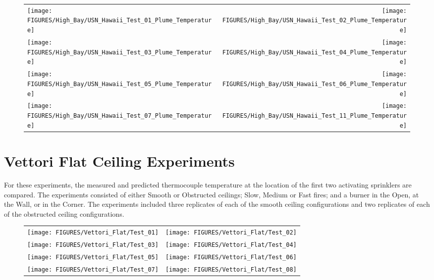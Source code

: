 \begin{figure}[p]
\begin{tabular*}{\textwidth}{l@{\extracolsep{\fill}}r}
\texttt{[image: FIGURES/High\_Bay/USN\_Hawaii\_Test\_01\_Plume\_Temperature]} &
\texttt{[image: FIGURES/High\_Bay/USN\_Hawaii\_Test\_02\_Plume\_Temperature]} \\
\texttt{[image: FIGURES/High\_Bay/USN\_Hawaii\_Test\_03\_Plume\_Temperature]} &
\texttt{[image: FIGURES/High\_Bay/USN\_Hawaii\_Test\_04\_Plume\_Temperature]} \\
\texttt{[image: FIGURES/High\_Bay/USN\_Hawaii\_Test\_05\_Plume\_Temperature]} &
\texttt{[image: FIGURES/High\_Bay/USN\_Hawaii\_Test\_06\_Plume\_Temperature]} \\
\texttt{[image: FIGURES/High\_Bay/USN\_Hawaii\_Test\_07\_Plume\_Temperature]} &
\texttt{[image: FIGURES/High\_Bay/USN\_Hawaii\_Test\_11\_Plume\_Temperature]}
\end{tabular*}
\label{USN_Plume_Hawaii}
\end{figure}

\clearpage

\section{Vettori Flat Ceiling Experiments}
\label{Vettori_Flat_Results}

For these experiments, the measured and predicted thermocouple temperature at the location of the first two activating sprinklers are compared. The experiments consisted of either Smooth or Obstructed ceilings; Slow, Medium or Fast fires; and a burner in the Open, at the Wall, or in the Corner. The experiments included three replicates of each of the smooth ceiling configurations and two replicates of each of the obstructed ceiling configurations.


\begin{figure}[p]
\begin{tabular*}{\textwidth}{l@{\extracolsep{\fill}}r}
\texttt{[image: FIGURES/Vettori\_Flat/Test\_01]} &
\texttt{[image: FIGURES/Vettori\_Flat/Test\_02]} \\
\texttt{[image: FIGURES/Vettori\_Flat/Test\_03]} &
\texttt{[image: FIGURES/Vettori\_Flat/Test\_04]} \\
\texttt{[image: FIGURES/Vettori\_Flat/Test\_05]} &
\texttt{[image: FIGURES/Vettori\_Flat/Test\_06]} \\
\texttt{[image: FIGURES/Vettori\_Flat/Test\_07]} &
\texttt{[image: FIGURES/Vettori\_Flat/Test\_08]} \\
\end{tabular*}
\label{Vettori_Plume_Temperature}
\end{figure}


